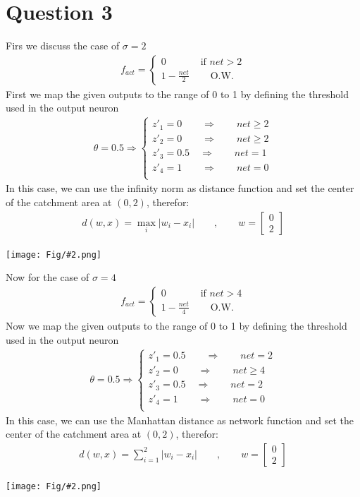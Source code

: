 \documentclass[]{article}
\newcommand{\pict}[2]{\begin{center}
		\texttt{[image: Fig/\#2.png]}
\end{center}}
\newcommand{\mat}[1]{\begin{bmatrix} #1 \end{bmatrix}}
\begin{document}
	\section{Question 3}
	Firs we discuss the case of $\sigma = 2$
	\begin{align*}
		f_{act} = \begin{cases}
			0 \qquad & \text{ if } net > 2\\
			1 - \frac{net}{2} & \quad\text{ O.W.}
		\end{cases}
	\end{align*}
	First we map the given outputs to the range of 0 to 1 by defining the threshold used in the output neuron
	\begin{align*}
		\theta = 0.5 \Rightarrow \begin{cases}
			z'_1 = 0	\qquad \Rightarrow \qquad net \ge 2\\
			z'_2 = 0	\qquad \Rightarrow \qquad net \ge 2\\
			z'_3 = 0.5	\quad \Rightarrow \qquad net = 1\\
			z'_4 = 1	\qquad \Rightarrow \qquad net = 0\\
		\end{cases}
	\end{align*}
	In this case, we can use the infinity norm as distance function and set the center of the catchment area at $(0,2)$, therefor:
	\begin{align*}
		d(w, x) = \max_{i} |w_i - x_i|\qquad , \qquad w = \mat{0\\2}
	\end{align*}
	\pict{0.4}{F4}
	Now for the case of $\sigma = 4$
	\begin{align*}
		f_{act} = \begin{cases}
			0 \qquad & \text{ if } net > 4\\
			1 - \frac{net}{4} & \quad\text{ O.W.}
		\end{cases}
	\end{align*}
	Now we map the given outputs to the range of 0 to 1 by defining the threshold used in the output neuron
	\begin{align*}
		\theta = 0.5 \Rightarrow \begin{cases}
			z'_1 = 0.5	\qquad \Rightarrow \qquad net = 2\\
			z'_2 = 0	\qquad \Rightarrow \qquad net \ge 4\\
			z'_3 = 0.5	\quad \Rightarrow \qquad net = 2\\
			z'_4 = 1	\qquad \Rightarrow \qquad net = 0\\
		\end{cases}
	\end{align*}
	In this case, we can use the Manhattan distance as network function and set the center of the catchment area at $(0,2)$, therefor:
	\begin{align*}
		d(w, x) = \sum_{i=1}^{2} |w_i - x_i|\qquad , \qquad w = \mat{0\\2}
	\end{align*}
	\pict{0.4}{F4}
\end{document}
